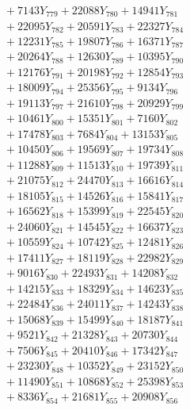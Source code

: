 \documentclass[a4paper,10pt]{article}
\begin{document}
{\begin{align}
&\;  + 7143 Y_{779} + 22088 Y_{780} + 14941 Y_{781} \\[0.3ex]
&\;  + 22095 Y_{782} + 20591 Y_{783} + 22327 Y_{784} \\[0.3ex]
&\;  + 12231 Y_{785} + 19807 Y_{786} + 16371 Y_{787} \\[0.3ex]
&\;  + 20264 Y_{788} + 12630 Y_{789} + 10395 Y_{790} \\[0.3ex]
&\;  + 12176 Y_{791} + 20198 Y_{792} + 12854 Y_{793} \\[0.3ex]
&\;  + 18009 Y_{794} + 25356 Y_{795} + 9134 Y_{796} \\[0.3ex]
&\;  + 19113 Y_{797} + 21610 Y_{798} + 20929 Y_{799} \\[0.3ex]
&\;  + 10461 Y_{800} + 15351 Y_{801} + 7160 Y_{802} \\[0.3ex]
&\;  + 17478 Y_{803} + 7684 Y_{804} + 13153 Y_{805} \\[0.3ex]
&\;  + 10450 Y_{806} + 19569 Y_{807} + 19734 Y_{808} \\[0.5ex]\allowbreak
&\;  + 11288 Y_{809} + 11513 Y_{810} + 19739 Y_{811} \\[0.3ex]
&\;  + 21075 Y_{812} + 24470 Y_{813} + 16616 Y_{814} \\[0.3ex]
&\;  + 18105 Y_{815} + 14526 Y_{816} + 15841 Y_{817} \\[0.3ex]
&\;  + 16562 Y_{818} + 15399 Y_{819} + 22545 Y_{820} \\[0.3ex]
&\;  + 24060 Y_{821} + 14545 Y_{822} + 16637 Y_{823} \\[0.3ex]
&\;  + 10559 Y_{824} + 10742 Y_{825} + 12481 Y_{826} \\[0.3ex]
&\;  + 17411 Y_{827} + 18119 Y_{828} + 22982 Y_{829} \\[0.3ex]
&\;  + 9016 Y_{830} + 22493 Y_{831} + 14208 Y_{832} \\[0.3ex]
&\;  + 14215 Y_{833} + 18329 Y_{834} + 14623 Y_{835} \\[0.3ex]
&\;  + 22484 Y_{836} + 24011 Y_{837} + 14243 Y_{838} \\[0.5ex]\allowbreak
&\;  + 15068 Y_{839} + 15499 Y_{840} + 18187 Y_{841} \\[0.3ex]
&\;  + 9521 Y_{842} + 21328 Y_{843} + 20730 Y_{844} \\[0.3ex]
&\;  + 7506 Y_{845} + 20410 Y_{846} + 17342 Y_{847} \\[0.3ex]
&\;  + 23230 Y_{848} + 10352 Y_{849} + 23152 Y_{850} \\[0.3ex]
&\;  + 11490 Y_{851} + 10868 Y_{852} + 25398 Y_{853} \\[0.3ex]
&\;  + 8336 Y_{854} + 21681 Y_{855} + 20908 Y_{856} \\[0.3ex]

\end{align}}
\end{document}

